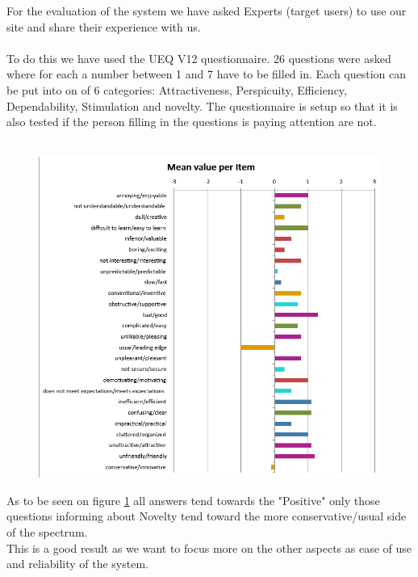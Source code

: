 \documentclass{article}
\begin{document}
	For the evaluation of the system we have asked Experts (target users) to use our site and share their experience with us.\\
	\\ 
	To do this we have used the UEQ V12 questionnaire. 26 questions were asked where for each a number between 1 and 7 have to be filled in. Each question can be put into on of 6 categories: Attractiveness, Perspicuity, Efficiency, Dependability, Stimulation and novelty. The questionnaire is setup so that it is also tested if the person filling in the questions is paying attention are not.\\
	\\
	\begin{figure}[h]
		\centering
		\includegraphics[width=\linewidth]{./Screenshots/Mean_value_per_item.png}
		\label{fig:mean_value}
	\end{figure}
	\par
	
	As to be seen on figure \ref{fig:mean_value} all answers tend towards the "Positive" only those questions informing about Novelty tend toward the more conservative/usual side of the spectrum.\\
	This is a good result as we want to focus more on the other aspects as ease of use and reliability of the system.\\
	
\end{document}
